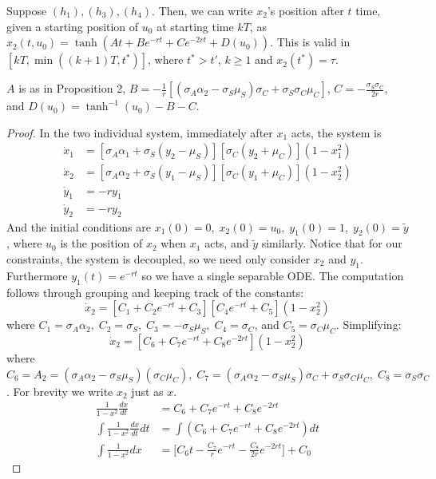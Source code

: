 \documentclass[10pt,a4paper]{amsart}
\newcommand{\wt}{\widetilde}
\begin{document}
\begin{prop}\label{Prop:explicitSolution}
    Suppose $(h_1), (h_3), (h_4)$. Then, we can write $x_2$'s position after $t$ time, given a starting position of $u_0$ at starting time $kT$, as $x_2(t, u_0) = \tanh(At+Be^{-rt} + Ce^{-2rt} + D(u_0))$. This is valid in $[kT, \min((k+1)T, t^*)]$, where $t^* > t'$, $k \geq 1$ and $x_2(t^*) = \tau$.

    $A$ is as in Proposition 2, $B=-\frac{1}{r}[(\sigma_A\alpha_2-\sigma_S\mu_S)\sigma_C+\sigma_S\sigma_C\mu_C]$, $C=-\frac{\sigma_S\sigma_C}{2r}$, and $D(u_0)=\tanh^{-1}(u_0)-B-C$.
\end{prop}

\begin{proof} In the two individual system, immediately after $x_1$ acts, the system is
\begin{equation}
    \begin{split}
        \dot{x}_1&=[\sigma_A\alpha_1+\sigma_S(y_2-\mu_S)][\sigma_C(y_2+\mu_C)](1-x_1^2)\\
        \dot{x}_2&=[\sigma_A\alpha_2+\sigma_S(y_1-\mu_S)][\sigma_C(y_1+\mu_C)](1-x_2^2)\\
        \dot y_1 &= -ry_1\\
        \dot y_2 &= -ry_2
    \end{split}
\end{equation}
And the initial conditions are $x_1(0)=0,\; x_2(0)= u_0,\; y_1(0)=1,\;y_2(0)= \wt y $, where $u_0$ is the position of $x_2$ when $x_1$ acts, and $\wt y$ similarly. Notice that for our constraints, the system is decoupled, so we need only consider $x_2$ and $y_1$. Furthermore $y_1(t)=e^{-rt}$ so we have a single separable ODE. The computation follows through grouping and keeping track of the constants:
\[\dot{x}_2=[C_1+C_2e^{-rt}+C_3][C_4e^{-rt}+C_5](1-x_2^2)\]
where $C_1=\sigma_A\alpha_2, \;C_2 = \sigma_S,\; C_3=-\sigma_S\mu_S,\; C_4=\sigma_C$, and $C_5=\sigma_C\mu_C$. Simplifying:
\[\dot x_2 = [C_6+C_7e^{-rt}+C_8e^{-2rt}](1-x_2^2)\]
where $C_6= A_2 = (\sigma_A\alpha_2-\sigma_S\mu_S)(\sigma_C\mu_C),\; C_7 = (\sigma_A\alpha_2-\sigma_S\mu_S)\sigma_C+ \sigma_S\sigma_C\mu_C,\; C_8=\sigma_S\sigma_C$. For brevity we write $x_2$ just as $x$.
\begin{equation*}
    \begin{split}
        \frac{1}{1-x^2}\frac{dx}{dt}&=C_6+C_7e^{-rt}+C_8e^{-2rt}\\
        \int\frac{1}{1-x^2}\frac{dx}{dt}dt&=\int(C_6+C_7e^{-rt}+C_8e^{-2rt})dt\\
        \int\frac{1}{1-x^2}{dx}&=\big[C_6t-\frac{C_7}{r}e^{-rt}-\frac{C_8}{2r}e^{-2rt}\big]+C_0

\end{split}
\end{equation*}
\end{proof}
\end{document}
